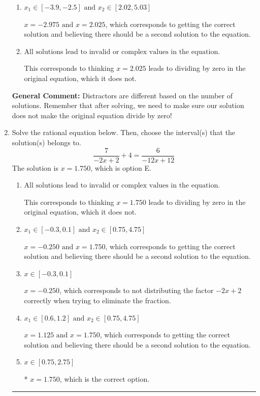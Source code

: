 \documentclass{extbook}[14pt]
\newcommand{\litem}[1]{\item #1

\rule{\textwidth}{0.4pt}}
\begin{document}
\begin{enumerate}
{\begin{enumerate}[label=\Alph*.]
$x = 1.625 \text{ and } x = 2.025$, which corresponds to getting the correct solution and believing there should be a second solution to the equation.
\item \( x_1 \in [-3.9, -2.5] \text{ and } x_2 \in [2.02,5.03] \)

$x = -2.975 \text{ and } x = 2.025$, which corresponds to getting the correct solution and believing there should be a second solution to the equation.
\item \( \text{All solutions lead to invalid or complex values in the equation.} \)

This corresponds to thinking $x = 2.025$ leads to dividing by zero in the original equation, which it does not.
\end{enumerate}

\textbf{General Comment:} Distractors are different based on the number of solutions. Remember that after solving, we need to make sure our solution does not make the original equation divide by zero!
}
\litem{
Solve the rational equation below. Then, choose the interval(s) that the solution(s) belongs to.
\[ \frac{7}{-2x + 2} + 4 = \frac{6}{-12x + 12} \]
The solution is \( x = 1.750 \), which is option E.\begin{enumerate}[label=\Alph*.]
\item \( \text{All solutions lead to invalid or complex values in the equation.} \)

This corresponds to thinking $x = 1.750$ leads to dividing by zero in the original equation, which it does not.
\item \( x_1 \in [-0.3, 0.1] \text{ and } x_2 \in [0.75,4.75] \)

$x = -0.250 \text{ and } x = 1.750$, which corresponds to getting the correct solution and believing there should be a second solution to the equation.
\item \( x \in [-0.3,0.1] \)

$x = -0.250$, which corresponds to not distributing the factor $-2x + 2$ correctly when trying to eliminate the fraction.
\item \( x_1 \in [0.6, 1.2] \text{ and } x_2 \in [0.75,4.75] \)

$x = 1.125 \text{ and } x = 1.750$, which corresponds to getting the correct solution and believing there should be a second solution to the equation.
\item \( x \in [0.75,2.75] \)

* $x = 1.750$, which is the correct option.
\end{enumerate}

}
\end{enumerate}
\end{document}
